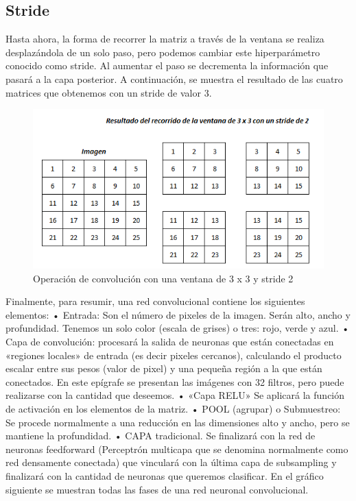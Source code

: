 \documentclass[
  a4paper,
  DIV=11,
  numbers=noendperiod]{scrreprt}
\begin{document}
\hypertarget{stride}{%
\subsection{Stride}\label{stride}}

Hasta ahora, la forma de recorrer la matriz a través de la ventana se
realiza desplazándola de un solo paso, pero podemos cambiar este
hiperparámetro conocido como stride. Al aumentar el paso se decrementa
la información que pasará a la capa posterior. A continuación, se
muestra el resultado de las cuatro matrices que obtenemos con un stride
de valor 3.

\begin{figure}

{\centering \includegraphics{imagenes/capitulo1/con_stride2.png}

}

\caption{\label{fig-con-stride2}Operación de convolución con una ventana
de 3 x 3 y stride 2}

\end{figure}

Finalmente, para resumir, una red convolucional contiene los siguientes
elementos: • Entrada: Son el número de pixeles de la imagen. Serán alto,
ancho y profundidad. Tenemos un solo color (escala de grises) o tres:
rojo, verde y azul. • Capa de convolución: procesará la salida de
neuronas que están conectadas en «regiones locales» de entrada (es decir
pixeles cercanos), calculando el producto escalar entre sus pesos (valor
de pixel) y una pequeña región a la que están conectados. En este
epígrafe se presentan las imágenes con 32 filtros, pero puede realizarse
con la cantidad que deseemos. • «Capa RELU» Se aplicará la función de
activación en los elementos de la matriz. • POOL (agrupar) o
Submuestreo: Se procede normalmente a una reducción en las dimensiones
alto y ancho, pero se mantiene la profundidad. • CAPA tradicional. Se
finalizará con la red de neuronas feedforward (Perceptrón multicapa que
se denomina normalmente como red densamente conectada) que vinculará con
la última capa de subsampling y finalizará con la cantidad de neuronas
que queremos clasificar. En el gráfico siguiente se muestran todas las
fases de una red neuronal convolucional.
\end{document}

